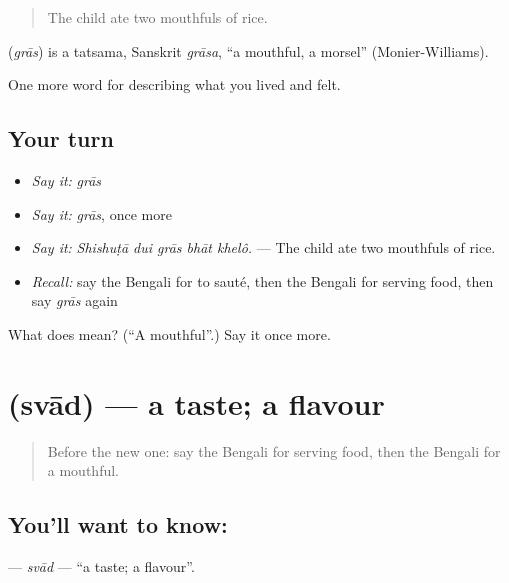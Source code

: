 \begin{quote}
The child ate two mouthfuls of rice.
\end{quote}

\begin{cousinweb}
\textbf{} (\emph{grās}) is a tatsama, Sanskrit \emph{grāsa}, \textquotedblleft{}a mouthful, a morsel\textquotedblright{} (Monier-Williams).
\end{cousinweb}

\begin{grammarlens}[title={What you've built}]
One more word for describing what you lived and felt.
\end{grammarlens}

\subsection*{Your turn}
\begin{itemize}
\raggedright
  \item \emph{Say it:} \emph{grās}
  \item \emph{Say it:} \emph{grās}, once more
  \item \emph{Say it:} \emph{Shishuṭā dui grās bhāt khelô.} — The child ate two mouthfuls of rice.
  \item \emph{Recall:} say the Bengali for to sauté, then the Bengali for serving food, then say \emph{grās} again
\end{itemize}

\begin{tcolorbox}[breakable,colback=teal!4,colframe=teal!35!black,title={Before you move on}]
What does  mean? (\textquotedblleft{}A mouthful\textquotedblright{}.) Say it once more.
\end{tcolorbox}
\section[\texorpdfstring{\bn{স্বাদ} (svād)}{স্বাদ (svād)}]{ (svād) — a taste; a flavour}

\label{lesson:BN-C515-svad}



\begin{quote}
Before the new one: say the Bengali for serving food, then the Bengali for a mouthful.
\end{quote}

\subsection*{You'll want to know: }
\textbf{} — \emph{svād} — \textquotedblleft{}a taste; a flavour\textquotedblright{}.


